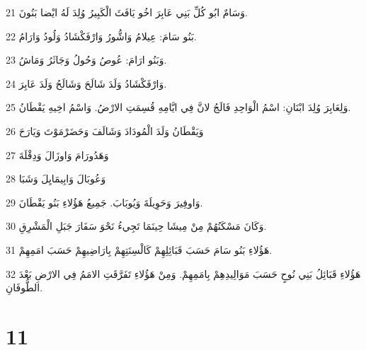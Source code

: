 \par 21 وَسَامٌ ابُو كُلِّ بَنِي عَابِرَ اخُو يَافَثَ الْكَبِيرُ وُلِدَ لَهُ ايْضا بَنُونَ.
\par 22 بَنُو سَامَ: عِيلامُ وَاشُّورُ وَارْفَكْشَادُ وَلُودُ وَارَامُ.
\par 23 وَبَنُو ارَامَ: عُوصُ وَحُولُ وَجَاثَرُ وَمَاشُ.
\par 24 وَارْفَكْشَادُ وَلَدَ شَالَحَ وَشَالَحُ وَلَدَ عَابِرَ.
\par 25 وَلِعَابِرَ وُلِدَ ابْنَانِ: اسْمُ الْوَاحِدِ فَالَجُ لانَّ فِي ايَّامِهِ قُسِمَتِ الارْضُ. وَاسْمُ اخِيهِ يَقْطَانُ.
\par 26 وَيَقْطَانُ وَلَدَ الْمُودَادَ وَشَالَفَ وَحَضَرْمَوْتَ وَيَارَحَ
\par 27 وَهَدُورَامَ وَاوزَالَ وَدِقْلَةَ
\par 28 وَعُوبَالَ وَابِيمَايِلَ وَشَبَا
\par 29 وَاوفِيرَ وَحَوِيلَةَ وَيُوبَابَ. جَمِيعُ هَؤُلاءِ بَنُو يَقْطَانَ.
\par 30 وَكَانَ مَسْكَنُهُمْ مِنْ مِيشَا حِينَمَا تَجِيءُ نَحْوَ سَفَارَ جَبَلِ الْمَشْرِقِ.
\par 31 هَؤُلاءِ بَنُو سَامَ حَسَبَ قَبَائِلِهِمْ كَالْسِنَتِهِمْ بِارَاضِيهِمْ حَسَبَ امَمِهِمْ.
\par 32 هَؤُلاءِ قَبَائِلُ بَنِي نُوحٍ حَسَبَ مَوَالِيدِهِمْ بِامَمِهِمْ. وَمِنْ هَؤُلاءِ تَفَرَّقَتِ الامَمُ فِي الارْضِ بَعْدَ الطُّوفَانِ.

\chapter{11}

